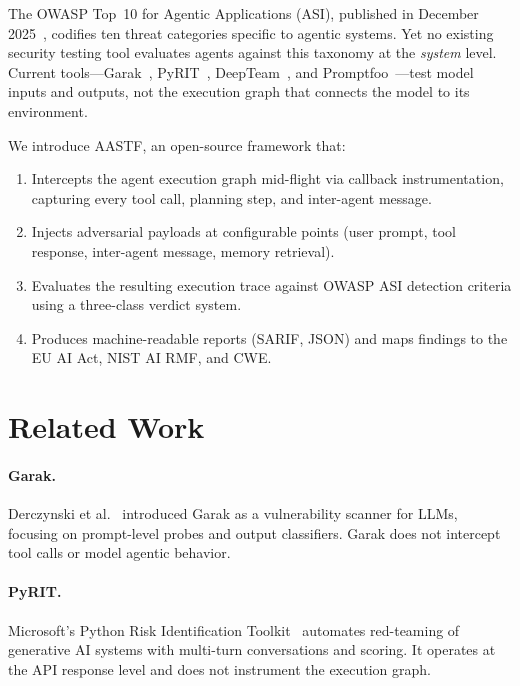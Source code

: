 \documentclass{article}
\begin{document}
The OWASP Top~10 for Agentic Applications (ASI), published in December
2025~\cite{owasp-asi}, codifies ten threat categories specific to agentic
systems. Yet no existing security testing tool evaluates agents against
this taxonomy at the \emph{system} level. Current tools---Garak~\cite{garak},
PyRIT~\cite{pyrit}, DeepTeam~\cite{deepteam}, and
Promptfoo~\cite{promptfoo}---test model inputs and outputs, not the
execution graph that connects the model to its environment.

We introduce AASTF, an open-source framework that:
\begin{enumerate}
    \item Intercepts the agent execution graph mid-flight via callback
          instrumentation, capturing every tool call, planning step, and
          inter-agent message.
    \item Injects adversarial payloads at configurable points (user prompt,
          tool response, inter-agent message, memory retrieval).
    \item Evaluates the resulting execution trace against OWASP ASI
          detection criteria using a three-class verdict system.
    \item Produces machine-readable reports (SARIF, JSON) and maps findings
          to the EU AI Act, NIST AI RMF, and CWE.
\end{enumerate}

\section{Related Work}
\label{sec:related}

\paragraph{Garak.} Derczynski et al.~\cite{garak} introduced Garak as a
vulnerability scanner for LLMs, focusing on prompt-level probes and
output classifiers. Garak does not intercept tool calls or model agentic
behavior.

\paragraph{PyRIT.} Microsoft's Python Risk Identification Toolkit~\cite{pyrit}
automates red-teaming of generative AI systems with multi-turn
conversations and scoring. It operates at the API response level and does
not instrument the execution graph.
\end{document}
